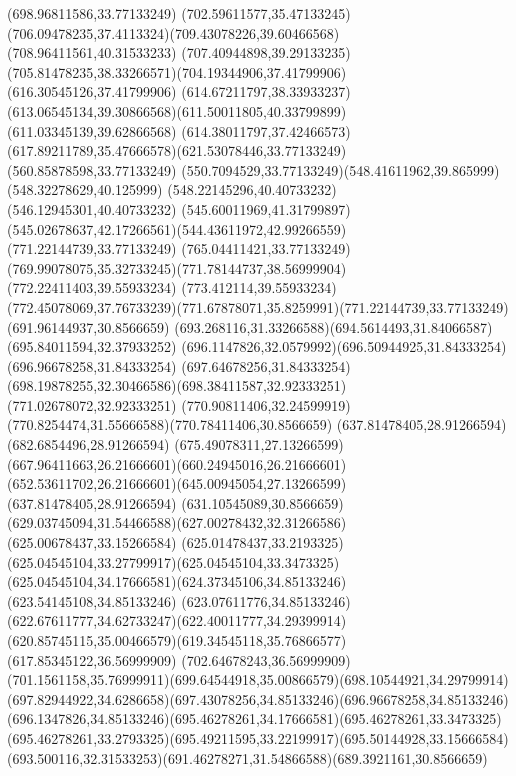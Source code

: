 {{	\lineto(698.96811586,33.77133249)
	\curveto(702.59611577,35.47133245)(706.09478235,37.4113324)(709.43078226,39.60466568)
	\lineto(708.96411561,40.31533233)
	\curveto(707.40944898,39.29133235)(705.81478235,38.33266571)(704.19344906,37.41799906)
	\lineto(616.30545126,37.41799906)
	\curveto(614.67211797,38.33933237)(613.06545134,39.30866568)(611.50011805,40.33799899)
	\lineto(611.03345139,39.62866568)
	\curveto(614.38011797,37.42466573)(617.89211789,35.47666578)(621.53078446,33.77133249)
	\lineto(560.85878598,33.77133249)
	\curveto(550.7094529,33.77133249)(548.41611962,39.865999)(548.32278629,40.125999)
	\lineto(548.22145296,40.40733232)
	\lineto(546.12945301,40.40733232)
	\curveto(545.60011969,41.31799897)(545.02678637,42.17266561)(544.43611972,42.99266559)
	\closepath
	\moveto(771.22144739,33.77133249)
	\lineto(765.04411421,33.77133249)
	\curveto(769.99078075,35.32733245)(771.78144737,38.56999904)(772.22411403,39.55933234)
	\lineto(773.412114,39.55933234)
	\curveto(772.45078069,37.76733239)(771.67878071,35.8259991)(771.22144739,33.77133249)
	\moveto(691.96144937,30.8566659)
	\curveto(693.268116,31.33266588)(694.5614493,31.84066587)(695.84011594,32.37933252)
	\curveto(696.1147826,32.0579992)(696.50944925,31.84333254)(696.96678258,31.84333254)
	\curveto(697.64678256,31.84333254)(698.19878255,32.30466586)(698.38411587,32.92333251)
	\lineto(771.02678072,32.92333251)
	\curveto(770.90811406,32.24599919)(770.8254474,31.55666588)(770.78411406,30.8566659)
	\closepath
	\moveto(637.81478405,28.91266594)
	\lineto(682.6854496,28.91266594)
	\curveto(675.49078311,27.13266599)(667.96411663,26.21666601)(660.24945016,26.21666601)
	\curveto(652.53611702,26.21666601)(645.00945054,27.13266599)(637.81478405,28.91266594)
	\moveto(631.10545089,30.8566659)
	\curveto(629.03745094,31.54466588)(627.00278432,32.31266586)(625.00678437,33.15266584)
	\curveto(625.01478437,33.2193325)(625.04545104,33.27799917)(625.04545104,33.3473325)
	\curveto(625.04545104,34.17666581)(624.37345106,34.85133246)(623.54145108,34.85133246)
	\curveto(623.07611776,34.85133246)(622.67611777,34.62733247)(622.40011777,34.29399914)
	\curveto(620.85745115,35.00466579)(619.34545118,35.76866577)(617.85345122,36.56999909)
	\lineto(702.64678243,36.56999909)
	\curveto(701.1561158,35.76999911)(699.64544918,35.00866579)(698.10544921,34.29799914)
	\curveto(697.82944922,34.6286658)(697.43078256,34.85133246)(696.96678258,34.85133246)
	\curveto(696.1347826,34.85133246)(695.46278261,34.17666581)(695.46278261,33.3473325)
	\curveto(695.46278261,33.2793325)(695.49211595,33.22199917)(695.50144928,33.15666584)
	\curveto(693.500116,32.31533253)(691.46278271,31.54866588)(689.3921161,30.8566659)
}}
